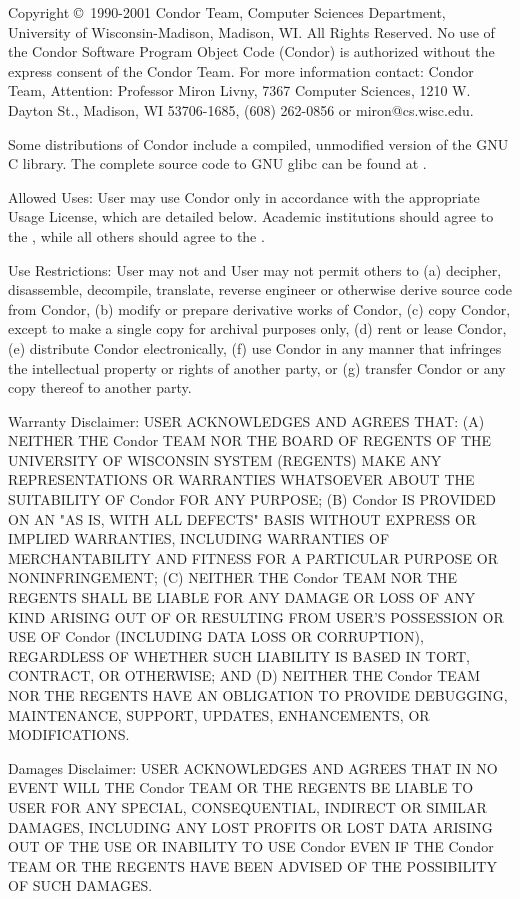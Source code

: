Copyright \copyright\ 1990-2001 Condor Team, Computer Sciences
Department, University of Wisconsin-Madison, Madison, WI. All Rights
Reserved. No use of the Condor Software Program Object Code (Condor)
is authorized without the express consent of the Condor Team. For more
information contact: Condor Team, Attention: Professor Miron Livny,
7367 Computer Sciences, 1210 W. Dayton St., Madison, WI 53706-1685,
(608) 262-0856 or miron@cs.wisc.edu. 

Some distributions of Condor include a compiled, unmodified version of 
the GNU C library.  The complete source code to GNU glibc can be 
found at .

Allowed Uses: User may use Condor only in accordance with the
appropriate Usage License, which are detailed below.  Academic
institutions should agree to the , while all others should agree to the .

Use Restrictions: User may not and User may not permit others to (a)
decipher, disassemble, decompile, translate, reverse engineer or
otherwise derive source code from Condor, (b) modify or prepare
derivative works of Condor, (c) copy Condor, except to make a single
copy for archival purposes only, (d) rent or lease Condor, (e)
distribute Condor electronically, (f) use Condor in any manner that
infringes the intellectual property or rights of another party, or (g)
transfer Condor or any copy thereof to another party. 

Warranty Disclaimer: USER ACKNOWLEDGES AND AGREES THAT: (A) NEITHER
THE Condor TEAM NOR THE BOARD OF REGENTS OF THE UNIVERSITY OF
WISCONSIN SYSTEM (REGENTS) MAKE ANY REPRESENTATIONS OR WARRANTIES
WHATSOEVER ABOUT THE SUITABILITY OF Condor FOR ANY PURPOSE; (B) Condor
IS PROVIDED ON AN "AS IS, WITH ALL DEFECTS" BASIS WITHOUT EXPRESS OR
IMPLIED WARRANTIES, INCLUDING WARRANTIES OF MERCHANTABILITY AND
FITNESS FOR A PARTICULAR PURPOSE OR NONINFRINGEMENT; (C) NEITHER THE
Condor TEAM NOR THE REGENTS SHALL BE LIABLE FOR ANY DAMAGE OR LOSS OF
ANY KIND ARISING OUT OF OR RESULTING FROM USER'S POSSESSION OR USE
OF Condor (INCLUDING DATA LOSS OR CORRUPTION), REGARDLESS OF WHETHER
SUCH LIABILITY IS BASED IN TORT, CONTRACT, OR OTHERWISE; AND (D)
NEITHER THE Condor TEAM NOR THE REGENTS HAVE AN OBLIGATION TO PROVIDE
DEBUGGING, MAINTENANCE, SUPPORT, UPDATES, ENHANCEMENTS, OR
MODIFICATIONS. 

Damages Disclaimer: USER ACKNOWLEDGES AND AGREES THAT IN NO EVENT WILL
THE Condor TEAM OR THE REGENTS BE LIABLE TO USER FOR ANY SPECIAL,
CONSEQUENTIAL, INDIRECT OR SIMILAR DAMAGES, INCLUDING ANY LOST PROFITS
OR LOST DATA ARISING OUT OF THE USE OR INABILITY TO USE Condor EVEN IF
THE Condor TEAM OR THE REGENTS HAVE BEEN ADVISED OF THE POSSIBILITY OF
SUCH DAMAGES. 

